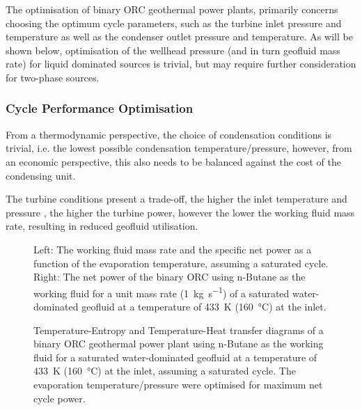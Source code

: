         The optimisation of binary \ac{ORC} geothermal power plants, primarily concerns choosing the optimum cycle parameters, such as the turbine inlet pressure and temperature as well as the condenser outlet pressure and temperature. As will be shown below, optimisation of the wellhead pressure (and in turn geofluid mass rate) for liquid dominated sources is trivial, but may require further consideration for two-phase sources.

        \subsubsection{Cycle Performance Optimisation}
            From a thermodynamic perspective, the choice of condensation conditions is trivial, i.e. the lowest possible condensation temperature/pressure, however, from an economic perspective, this also needs to be balanced against the cost of the condensing unit.

            The turbine conditions present a trade-off, the higher the inlet temperature and pressure , the higher the turbine power, however the lower the working fluid mass rate, resulting in reduced geofluid utilisation.

             \begin{figure}[H]
                \centering
                
                \caption[Optimisation of the maximum cycle temperature for saturated binary \ac{ORC} geothermal power plant.]{Left: The working fluid mass rate and the specific net power as a function of the evaporation temperature, assuming a saturated cycle. Right: The net power of the binary ORC using n-Butane as the working fluid for a unit mass rate (\qty{1}{\kg\per\s}) of a saturated water-dominated geofluid at a temperature of \qty{433}{\K} (\qty{160}{\degreeCelsius}) at the inlet.}
                \label{fig:litrev_ORC_Topt}
            \end{figure}

             \begin{figure}[H]
                \centering
                
                \caption[TS and TQ diagrams of a saturated binary \ac{ORC} with the maximum cycle temperature optimised for maximum net power.]{Temperature-Entropy and Temperature-Heat transfer diagrams of a binary ORC geothermal power plant using n-Butane as the working fluid for a saturated water-dominated geofluid at a temperature of \qty{433}{\K} (\qty{160}{\degreeCelsius}) at the inlet, assuming a saturated cycle. The evaporation temperature/pressure were optimised for maximum net cycle power.}
                \label{fig:litrev_ORC_Topt_TS}
            \end{figure}
        

